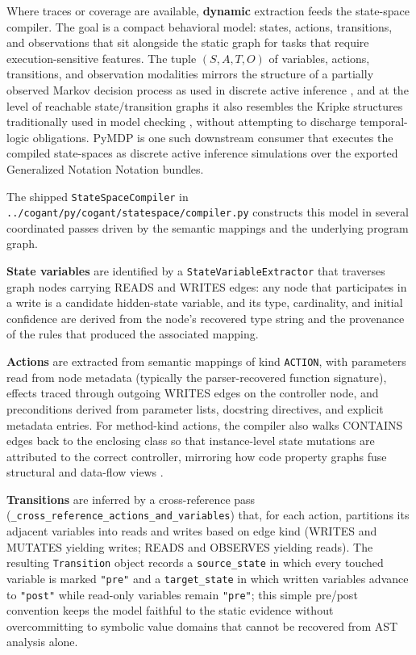 \documentclass[
]{article}
\begin{document}
Where traces or coverage are available, \textbf{dynamic} extraction
feeds the state-space compiler. The goal is a compact behavioral model:
states, actions, transitions, and observations that sit alongside the
static graph for tasks that require execution-sensitive features. The
tuple \((S, A, T, O)\) of variables, actions, transitions, and
observation modalities mirrors the structure of a partially observed
Markov decision process as used in discrete active inference
\citep{parr2022active, dacosta2020active, smith2022stepbystep}, and at
the level of reachable state/transition graphs it also resembles the
Kripke structures traditionally used in model checking
\citep{clarke1999model}, without attempting to discharge temporal-logic
obligations. PyMDP \citep{heins2022pymdp} is one such downstream
consumer that executes the compiled state-spaces as discrete active
inference simulations over the exported Generalized Notation Notation
bundles.

The shipped \texttt{StateSpaceCompiler} in
\texttt{../cogant/py/cogant/statespace/compiler.py} constructs this
model in several coordinated passes driven by the semantic mappings and
the underlying program graph.

\textbf{State variables} are identified by a
\texttt{StateVariableExtractor} that traverses graph nodes carrying
READS and WRITES edges: any node that participates in a write is a
candidate hidden-state variable, and its type, cardinality, and initial
confidence are derived from the node's recovered type string and the
provenance of the rules that produced the associated mapping.

\textbf{Actions} are extracted from semantic mappings of kind
\texttt{ACTION}, with parameters read from node metadata (typically the
parser-recovered function signature), effects traced through outgoing
WRITES edges on the controller node, and preconditions derived from
parameter lists, docstring directives, and explicit metadata entries.
For method-kind actions, the compiler also walks CONTAINS edges back to
the enclosing class so that instance-level state mutations are
attributed to the correct controller, mirroring how code property graphs
fuse structural and data-flow views \citep{yamaguchi2014modeling}.

\textbf{Transitions} are inferred by a cross-reference pass
(\texttt{\_cross\_reference\_actions\_and\_variables}) that, for each
action, partitions its adjacent variables into reads and writes based on
edge kind (WRITES and MUTATES yielding writes; READS and OBSERVES
yielding reads). The resulting \texttt{Transition} object records a
\texttt{source\_state} in which every touched variable is marked
\texttt{"pre"} and a \texttt{target\_state} in which written variables
advance to \texttt{"post"} while read-only variables remain
\texttt{"pre"}; this simple pre/post convention keeps the model faithful
to the static evidence without overcommitting to symbolic value domains
that cannot be recovered from AST analysis alone.
\end{document}
